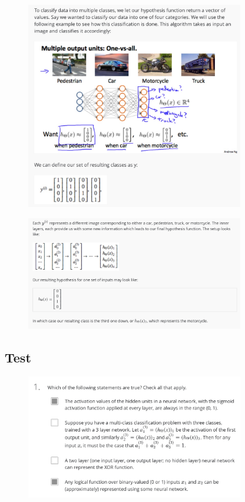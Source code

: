 \documentclass[12pt, A4,onecolumn]{article} %
\begin{document}
\begin{figure}[H]
	\centering
	\includegraphics[width=0.85\textwidth]{./ImagenesW4/multiClass1}
\end{figure}

\begin{figure}[H]
	\centering
	\includegraphics[width=0.85\textwidth]{./ImagenesW4/multiClass2}
\end{figure}

\subsection{Test}

\begin{figure}[H]
	\centering
	\includegraphics[width=0.85\textwidth]{./ImagenesW4/testNN1}
\end{figure}
\end{document}
